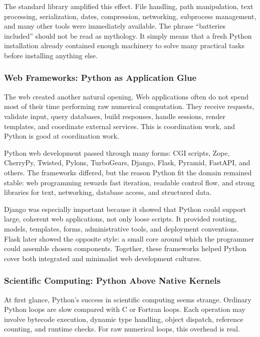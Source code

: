 The standard library amplified this effect. File handling, path manipulation, text processing, serialization, dates, compression, networking, subprocess management, and many other tools were immediately available. The phrase ``batteries included'' should not be read as mythology. It simply means that a fresh Python installation already contained enough machinery to solve many practical tasks before installing anything else.

\subsubsection{Web Frameworks: Python as Application Glue}

The web created another natural opening. Web applications often do not spend most of their time performing raw numerical computation. They receive requests, validate input, query databases, build responses, handle sessions, render templates, and coordinate external services. This is coordination work, and Python is good at coordination work.

Python web development passed through many forms: CGI scripts, Zope, CherryPy, Twisted, Pylons, TurboGears, Django, Flask, Pyramid, FastAPI, and others. The frameworks differed, but the reason Python fit the domain remained stable: web programming rewards fast iteration, readable control flow, and strong libraries for text, networking, database access, and structured data.

Django was especially important because it showed that Python could support large, coherent web applications, not only loose scripts. It provided routing, models, templates, forms, administrative tools, and deployment conventions. Flask later showed the opposite style: a small core around which the programmer could assemble chosen components. Together, these frameworks helped Python cover both integrated and minimalist web development cultures.

\subsubsection{Scientific Computing: Python Above Native Kernels}

At first glance, Python's success in scientific computing seems strange. Ordinary Python loops are slow compared with C or Fortran loops. Each operation may involve bytecode execution, dynamic type handling, object dispatch, reference counting, and runtime checks. For raw numerical loops, this overhead is real.

